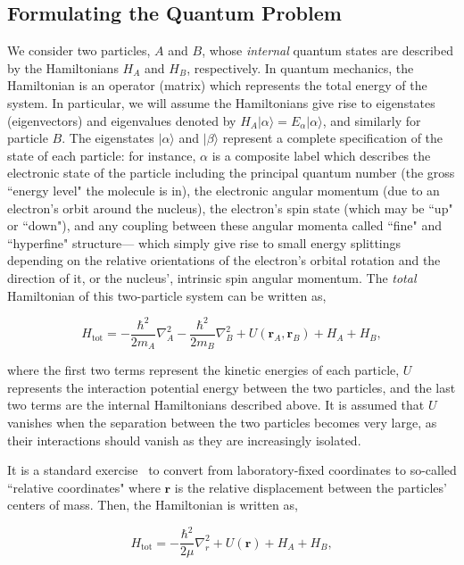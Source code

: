 \documentclass[%
 reprint,
 amsmath,amssymb,
 aps,
 nofootinbib
]{revtex4-1}
\begin{document}
\subsection{\label{sec:QuantumFormalism} Formulating the Quantum Problem}
We consider two particles, $A$ and $B$, whose \textit{internal} quantum states are described by the Hamiltonians $H_A$ and $H_B$, respectively. In quantum mechanics, the Hamiltonian is an operator (matrix) which represents the total energy of the system. In particular, we will assume the Hamiltonians give rise to eigenstates (eigenvectors) and eigenvalues denoted by $H_A \lvert \alpha \rangle = E_\alpha \lvert \alpha \rangle$, and similarly for particle $B$. The eigenstates $\lvert \alpha \rangle$ and $\lvert \beta \rangle$ represent a complete specification of the state of each particle: for instance, $\alpha$ is a composite label which describes the electronic state of the particle including the principal quantum number (the gross ``energy level" the molecule is in), the electronic angular momentum (due to an electron's orbit around the nucleus), the electron's spin state (which may be ``up" or ``down"), and any coupling between these angular momenta called ``fine" and ``hyperfine" structure--- which simply give rise to small energy splittings depending on the relative orientations of the electron's orbital rotation and the direction of it, or the nucleus', intrinsic spin angular momentum. The \textit{total} Hamiltonian of this two-particle system can be written as,

\begin{equation}
H_\text{tot} = -\frac{\hbar^2}{2m_A} \nabla_A^2 -\frac{\hbar^2}{2m_B}\nabla_B^2 + U(\mathbf{r}_A,\mathbf{r}_B) + H_A + H_B,
\end{equation}

\noindent where the first two terms represent the kinetic energies of each particle, $U$ represents the interaction potential energy between the two particles, and the last two terms are the internal Hamiltonians described above. It is assumed that $U$ vanishes when the separation between the two particles becomes very large, as their interactions should vanish as they are increasingly isolated. 

It is a standard exercise~\cite{ColdChemBook,Krems2017} to convert from laboratory-fixed coordinates to so-called ``relative coordinates" where $\mathbf{r}$ is the relative displacement between the particles' centers of mass. Then, the Hamiltonian is written as,

\begin{equation}
H_\text{tot} = -\frac{\hbar^2}{2\mu} \nabla_r^2 + U(\mathbf{r}) + H_A + H_B,
\label{eq:SchrodFinal}
\end{equation}
\end{document}
